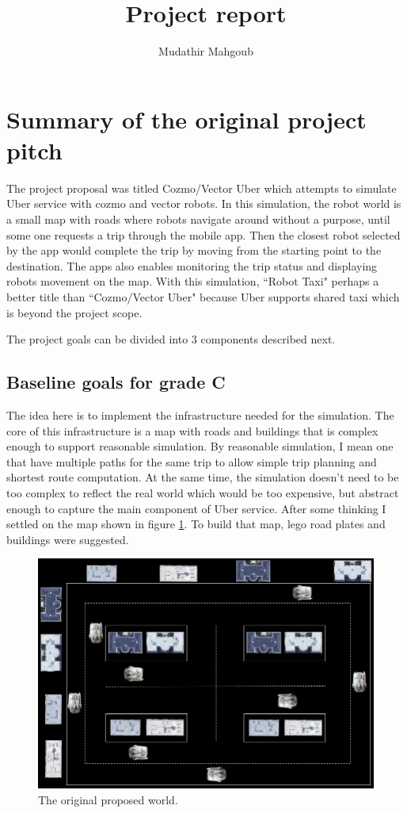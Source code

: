 \documentclass[12pt,a4paper]{article}
\author{Mudathir Mahgoub}
\title{Project report}
\begin{document}
\maketitle

\section{Summary of the original project pitch}

The project proposal was titled Cozmo/Vector Uber which attempts to simulate Uber service with cozmo and vector robots. In this simulation, the robot world is a small map with roads where robots navigate around without a purpose, until some one requests a trip through the mobile app. Then the closest robot selected by the app would complete the trip by moving from the starting point to the destination. The apps also enables monitoring the trip status and displaying robots movement on the map.  With this simulation, ``Robot Taxi" perhaps a better title than ``Cozmo/Vector Uber" because Uber supports shared taxi which is beyond the project 
scope. 

The project goals can be divided into 3 components described next. 

\subsection{Baseline goals for grade C} \label{sec:C}
The idea here is to implement the infrastructure needed for the simulation. The core of this infrastructure is a map with roads and buildings that is complex enough to support reasonable simulation. By reasonable simulation, I mean one that have multiple paths for the same trip to allow simple trip planning and shortest route computation. At the same time, the simulation doesn't need to be too complex to reflect the real world which would be too expensive, but abstract enough to capture the main component of Uber service. After some thinking I settled on the map shown in figure \ref{fig:proposedMap}. To build that map, lego road plates and buildings were suggested. 
\begin{figure}[H]
\center
\includegraphics[scale=0.5]{./original_map.png}
\caption{The original proposed world.} \label{fig:proposedMap} 
\end{figure}
\end{document}
